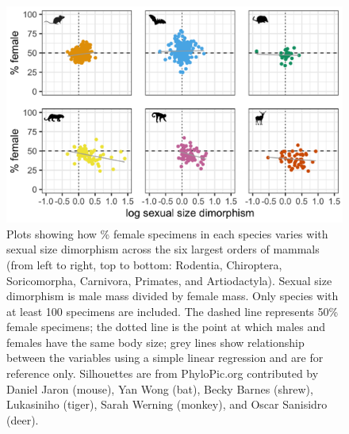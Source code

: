 \documentclass[a4paper, 12pt]{article}
\begin{document}
\begin{figure}
 \centering
  \includegraphics[width = \linewidth]{figures/ssd-orders-mammals.png}
  \caption{Plots showing how \% female specimens in each species varies with sexual size dimorphism across the six largest orders of mammals (from left to right, top to bottom: Rodentia, Chiroptera, Soricomorpha, Carnivora, Primates, and Artiodactyla). 
  Sexual size dimorphism is male mass divided by female mass. 
  Only species with at least 100 specimens are included. 
  The dashed line represents 50\% female specimens; the dotted line is the point at which males and females have the same body size; grey lines show relationship between the variables using a simple linear regression and are for reference only. 
  Silhouettes are from PhyloPic.org contributed by Daniel Jaron (mouse), Yan Wong (bat), Becky Barnes (shrew), Lukasiniho (tiger), Sarah Werning (monkey), and Oscar Sanisidro (deer).}
  \label{fig-mammal-ssd}
\end{figure}
\end{document}
